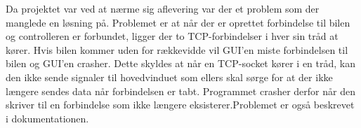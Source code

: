 Da projektet var ved at nærme sig aflevering var der et problem som der manglede en løsning på. Problemet er at når der er oprettet forbindelse til bilen og controlleren er forbundet, ligger der to TCP-forbindelser i hver sin tråd at kører. Hvis bilen kommer uden for rækkevidde vil GUI’en miste forbindelsen til bilen og GUI’en crasher. Dette skyldes at når en TCP-socket kører i en tråd, kan den ikke sende signaler til hovedvinduet som ellers skal sørge for at der ikke længere sendes data når forbindelsen er tabt. Programmet crasher derfor når den skriver til en forbindelse som ikke længere eksisterer.Problemet er også beskrevet i dokumentationen.